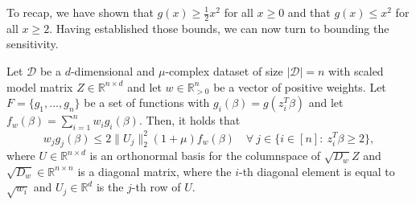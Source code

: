 To recap, we have shown that $g(x) \geq \frac{1}{2} x^2$ for all
$x \geq 0$ and that $g(x) \leq x^2$ for all $x \geq 2$.
Having established those bounds, we can now turn to bounding the sensitivity.

\begin{lemma}
    \label{lemma:g-bounds-1}
    Let $\mathcal{D}$ be a $d$-dimensional and $\mu$-complex dataset of size
    $|\mathcal{D}|=n$ with scaled model matrix
    $Z \in \mathbb{R}^{n \times d}$ and let $w \in \mathbb{R}^n_{>0}$
    be a vector of positive weights.
    Let $F = \{g_1, ..., g_n\}$ be a set of functions with
    $g_i(\beta) = g(z_i^T \beta)$ and let
    $f_w(\beta) = \sum_{i=1}^n w_ig_i(\beta)$.
    Then, it holds that
    \begin{equation*}
        w_jg_j(\beta) \leq 2 \lVert U_j \rVert_2^2(1 + \mu)f_w(\beta) \quad
        \forall\ j \in \{i \in [n]:\ z_i^T \beta \geq 2 \},
    \end{equation*}
    where $U \in \mathbb{R}^{n \times d}$ is an orthonormal basis for
    the columnspace of $\sqrt{D_w}Z$ and $\sqrt{D_w} \in \mathbb{R}^{n \times n}$
    is a diagonal matrix, where the $i$-th diagonal element is equal to
    $\sqrt{w_i}$ and $U_j \in \mathbb{R}^d$ is the $j$-th row of $U$.
\end{lemma}
